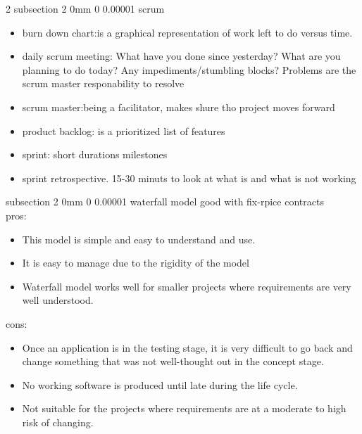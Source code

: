 \documentclass[a4paper,11pt]{article}
\makeatletter
\renewcommand{\subsection}{\@startsection
   {subsection}%
   {2}%
   {0mm}%
   {0\baselineskip}%
   {0.00001\baselineskip}%
   {\rmfamily\normalfont\slshape\normalsize}}%
\makeatother
\begin{document}
\begin{multicols}{2}
\subsection{scrum}
\vspace{0 mm}
\begin{itemize}
 \setlength\itemsep{0em}
\item burn down chart:is a graphical representation of work left to do versus time. 
\item daily scrum meeting:
    What have you done since yesterday?
    What are you planning to do today?
    Any impediments/stumbling blocks? Problems are the scrum master responability to resolve
\item scrum master:being a facilitator, makes shure tho project moves forward
\item product backlog: is a prioritized list of features
\item sprint: short durations milestones
\item sprint retrospective. 15-30 minuts to look at what is and what is not working
\end{itemize}

\subsection{waterfall model}
good with fix-rpice contracts\\
pros:
\vspace{0 mm}
\begin{itemize}
 \setlength\itemsep{0em}
\item This model is simple and easy to understand and use.
\item It is easy to manage due to the rigidity of the model 
\item Waterfall model works well for smaller projects where requirements are very well understood.
\end{itemize}
cons:
\vspace{0 mm}
\begin{itemize}
 \setlength\itemsep{0em}
\item Once an application is in the testing stage, it is very difficult to go back and change something that was not well-thought out in the concept stage.
\item No working software is produced until late during the life cycle.
\item Not suitable for the projects where requirements are at a moderate to high risk of changing.
\end{itemize}


\end{multicols}
\end{document}
